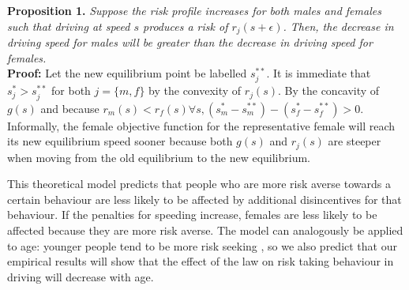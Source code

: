 
\textbf{Proposition 1.} {\it Suppose the risk profile increases 
for both males and females such that driving at speed $s$ 
produces a risk of $r_j (s+\epsilon)$. 
Then, the decrease in driving speed for males will be greater 
than the decrease in driving speed for females.} \\

\textbf{Proof:} Let the new equilibrium point be labelled $s_j^{**}$. 
It is immediate that $s_j^*>s_j^{**}$ 
for both $j=\{m,f\}$ by the convexity of $r_j (s)$. 
By the concavity of $g(s)$ 
and because 
$r_m (s)<r_f (s)  \forall s, 
(s_m^*-s_m^{**} ) - (s_f^*-s_f^{**})>0$. \\




Informally, the female objective function for the representative female 
will reach its new equilibrium speed sooner 
because both $g(s)$ and $r_j (s)$ are steeper 
when moving from the old equilibrium to the new equilibrium.

This theoretical model predicts that people who are more risk averse 
towards a certain behaviour are less likely to be affected 
by additional disincentives for that behaviour. 
If the penalties for speeding increase, 
females are less likely to be affected because they are more risk averse. 
The model can analogously be applied to age: 
younger people tend to be more risk seeking 
\citep[e.g.][]{gongyang2012}, 
so we also predict that our empirical results will show that the effect of the law 
on risk taking behaviour in driving will decrease with age.



